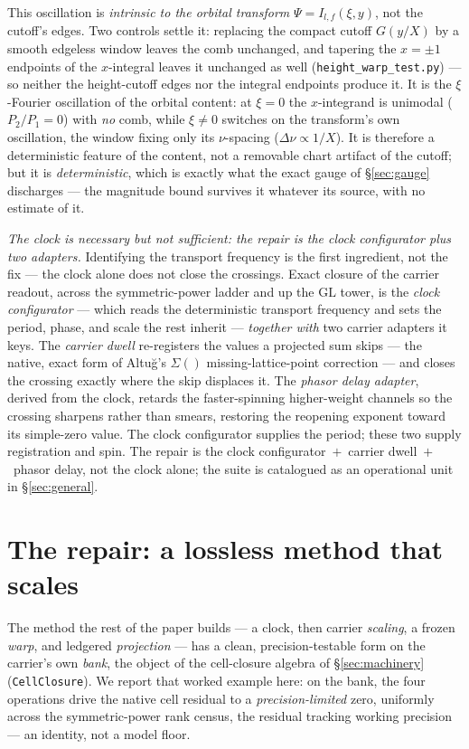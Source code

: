 \documentclass[11pt]{article}
\theoremstyle{definition}
\begin{document}
This oscillation is \emph{intrinsic to the orbital transform} $\Psi=I_{l,f}(\xi,y)$, not the cutoff's edges.
Two controls settle it: replacing the compact cutoff $G(y/X)$ by a smooth edgeless window leaves the comb
unchanged, and tapering the $x=\pm1$ endpoints of the $x$-integral leaves it unchanged as well
(\texttt{height\_warp\_test.py}) --- so neither the height-cutoff edges nor the integral endpoints produce it.
It is the $\xi$-Fourier oscillation of the orbital content: at $\xi=0$ the $x$-integrand is unimodal
($P_2/P_1=0$) with \emph{no} comb, while $\xi\neq0$ switches on the transform's own oscillation, the window
fixing only its $\nu$-spacing ($\Delta\nu\propto1/X$). It is therefore a deterministic feature of the content,
not a removable chart artifact of the cutoff; but it is \emph{deterministic}, which is exactly what the exact
gauge of \S\ref{sec:gauge} discharges --- the magnitude bound survives it whatever its source, with no estimate
of it.

\emph{The clock is necessary but not sufficient: the repair is the clock configurator plus two adapters.}
Identifying the transport frequency is the first ingredient, not the fix --- the clock alone does not close the
crossings. Exact closure of the carrier readout, across the symmetric-power ladder and up the $\mathrm{GL}$
tower, is the \emph{clock configurator} --- which reads the deterministic transport frequency and sets the
period, phase, and scale the rest inherit --- \emph{together with} two carrier adapters it keys. The
\emph{carrier dwell} re-registers the values a projected sum skips --- the native, exact form of Altu\u{g}'s
$\Sigma()$ missing-lattice-point correction --- and closes the crossing exactly where the skip displaces it. The
\emph{phasor delay adapter}, derived from the clock, retards the faster-spinning higher-weight channels so the
crossing sharpens rather than smears, restoring the reopening exponent toward its simple-zero value. The
clock configurator supplies the period; these two supply registration and spin. The repair is
the clock configurator~$+$~carrier dwell~$+$~phasor delay, not the clock alone; the
suite is catalogued as an operational unit in \S\ref{sec:general}.

\section{The repair: a lossless method that scales}\label{sec:pipeline}

The method the rest of the paper builds --- a clock, then carrier \emph{scaling}, a frozen \emph{warp}, and
ledgered \emph{projection} --- has a clean, precision-testable form on the carrier's own \emph{bank}, the
object of the cell-closure algebra of \S\ref{sec:machinery} (\texttt{CellClosure}). We report that worked
example here: on the bank, the four operations drive the native cell residual to a \emph{precision-limited}
zero, uniformly across the symmetric-power rank census, the residual tracking working precision --- an
identity, not a model floor.
\end{document}
